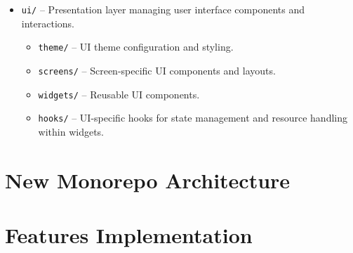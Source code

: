 \begin{itemize}
    \item \texttt{ui/} – Presentation layer managing user interface components and interactions.
    \begin{itemize}
        \item \texttt{theme/} – UI theme configuration and styling.
        \item \texttt{screens/} – Screen-specific UI components and layouts.
        \item \texttt{widgets/} – Reusable UI components.
        \item \texttt{hooks/} – UI-specific hooks for state management and resource handling within widgets.
    \end{itemize}
\end{itemize}


\section{New Monorepo Architecture}
\label{sec:new-monorepo-architecture}

\section{Features Implementation}
\label{sec:features-implementation}